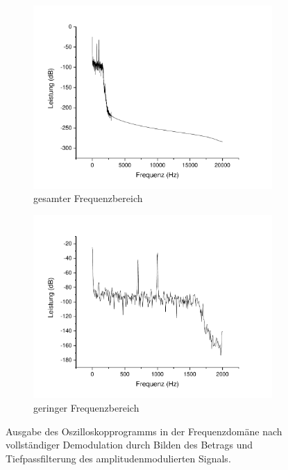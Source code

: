 \documentclass[
a4paper,
12pt,
pagesize,
ngerman
]{scrartcl}
\begin{document}
	\begin{figure}[H]
		\centering
		\begin{subfigure}[t]{0.5\textwidth}
			\centering
			\includegraphics[width=1\textwidth]{Origin-Files/AM-Demod-Betrag-demod}
			\caption{gesamter Frequenzbereich}
		\end{subfigure}%
		\begin{subfigure}[t]{0.5\textwidth}
			\centering
			\includegraphics[width=1\textwidth]{Origin-Files/AM-Demod-Betrag-demod-Bereich}
			\caption{geringer Frequenzbereich}
		\end{subfigure}
		\label{fig_tag3_am_demod_betrag_vollst}
		\caption{Ausgabe des Oszilloskopprogramms in der Frequenzdomäne nach vollständiger Demodulation durch Bilden des Betrags und Tiefpassfilterung des amplitudenmodulierten Signals.}
		\centering
	\end{figure}
\end{document}
